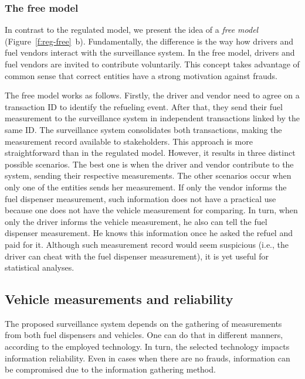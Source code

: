 \documentclass[sigplan]{acmart}
\begin{document}
\subsubsection{The free model}
\label{s:freemodel}
In contrast to the regulated model, we present the idea of a \emph{free model} (Figure~\ref{f:reg-free}~b).
Fundamentally, the difference is the way how drivers and fuel vendors interact with the surveillance system.
In the free model, drivers and fuel vendors are invited to contribute voluntarily.
This concept takes advantage of common sense that correct entities have a strong motivation against frauds.

The free model works as follows.
Firstly, the driver and vendor need to agree on a transaction ID to identify the refueling event. 
After that, they send their fuel measurement to the surveillance system in independent transactions linked by the same ID. 
The surveillance system consolidates both transactions, making the measurement record available to stakeholders.
This approach is more straightforward than in the regulated model.
However, it results in three distinct possible scenarios.
The best one is when the driver and vendor contribute to the system, sending their respective measurements.
The other scenarios occur when only one of the entities sends her measurement.
If only the vendor informs the fuel dispenser measurement, such information does not have a practical use because one does not have the vehicle measurement for comparing.
In turn, when only the driver informs the vehicle measurement, he also can tell the fuel dispenser measurement.
He knows this information once he asked the refuel and paid for it.
Although such measurement record would seem suspicious (i.e., the driver can cheat with the fuel dispenser measurement), it is yet useful for statistical analyses.

\subsection{Vehicle measurements and reliability}
The proposed surveillance system depends on the gathering of measurements from both fuel dispensers and vehicles.
One can do that in different manners, according to the employed technology.
In turn, the selected technology impacts information reliability.
Even in cases when there are no frauds, information can be compromised due to the information gathering method.
\end{document}
